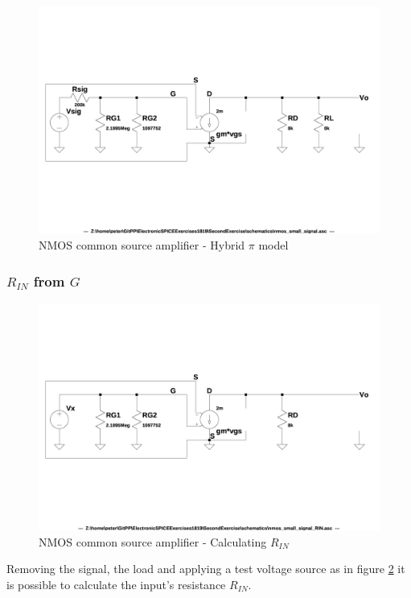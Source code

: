 \documentclass[10pt,a4paper]{book}
\begin{document}
\begin{figure}[h]
  \centering
  \includegraphics[width=12cm]{schematics/nmos_small_signal.jpg}
  \caption{NMOS common source amplifier - Hybrid $\pi$ model}
  \label{nmos_pi}
\end{figure}

\subsubsection{$R_{IN}$ from $G$}

\begin{figure}[h]
  \centering
  \includegraphics[width=12cm]{schematics/nmos_small_signal_RIN.jpg}
  \caption{NMOS common source amplifier - Calculating $R_{IN}$}
  \label{nmos_pi_RIN}
\end{figure}

Removing the signal, the load and applying a test voltage source as in figure \ref{nmos_pi_RIN} it is possible to calculate the input's resistance $R_{IN}$.\\
\end{document}
